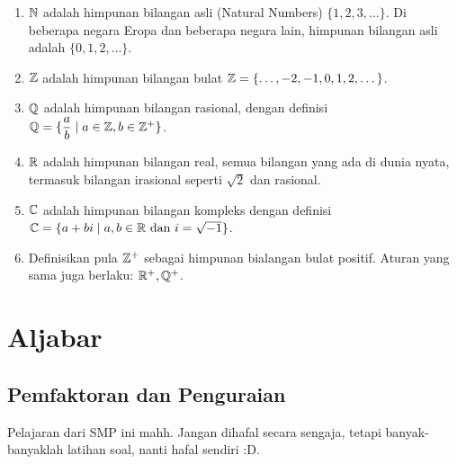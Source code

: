 \documentclass[11pt]{scrartcl}
\begin{document}
	\begin{enumerate}
	\item $\mathbb N$ adalah himpunan bilangan asli (Natural Numbers) $\{1,2,3,\dots\}$. Di beberapa negara Eropa dan beberapa negara lain, himpunan bilangan asli adalah $\{0,1,2,\dots\}$.
	\item $\mathbb Z$ adalah himpunan bilangan bulat $\mathbb Z=\{\dots,-2,-1,0,1,2,\dots\}$.
	\item $\mathbb Q$ adalah himpunan bilangan rasional, dengan definisi $\mathbb Q=\{\dfrac{a}{b}\mid a\in \mathbb Z, b\in\mathbb Z^+\}$.
	\item $\mathbb R$ adalah himpunan bilangan real, semua bilangan yang ada di dunia nyata, termasuk bilangan irasional seperti $\sqrt{2}$ dan rasional.
	\item $\mathbb C$ adalah himpunan bilangan kompleks dengan definisi\\ $\mathbb C = \{a+bi \mid a,b \in \mathbb R \text{ dan }i=\sqrt{-1}\}$.
	\item Definisikan pula $\mathbb Z^+$ sebagai himpunan bialangan bulat positif. Aturan yang sama juga berlaku: $\mathbb R^+, \mathbb Q^+$.
	\end{enumerate}
	

	
	\section{Aljabar}
	\subsection{Pemfaktoran dan Penguraian}
	Pelajaran dari SMP ini mahh. Jangan dihafal secara sengaja, tetapi banyak-banyaklah latihan soal, nanti hafal sendiri :D.
	
\end{document}
